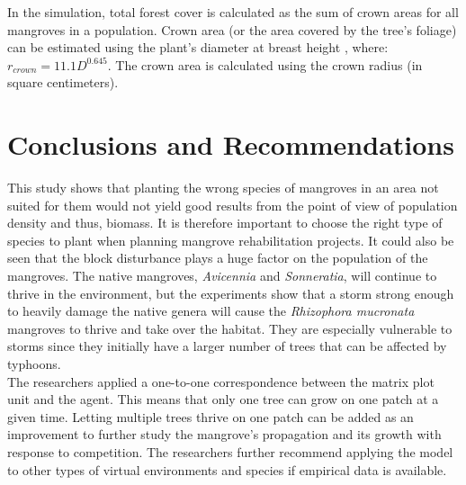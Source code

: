 In the simulation, total forest cover is calculated as the sum of crown areas for all mangroves in 
a population. Crown area (or the area covered by the tree's foliage) can be estimated using the
plant's diameter at breast height \cite{Hiebeler2000}, where: $r_{crown} = 11.1D^{0.645}$. The crown area is calculated using the crown radius (in square centimeters).

\section{Conclusions and
Recommendations}\label{conclusions-and-recommendations}

This study shows that planting the wrong species of mangroves in an area not
suited for them would not yield good results from the point of view of
population density and thus, biomass. It is therefore important to
choose the right type of species to plant when planning mangrove
rehabilitation projects. It could also be seen that the block
disturbance plays a huge factor on the population of the mangroves. The
native mangroves, \emph{Avicennia} and \emph{Sonneratia}, will continue
to thrive in the environment, but the experiments show that a storm
strong enough to heavily damage the native genera will cause the
\emph{Rhizophora mucronata} mangroves to thrive and take over the
habitat. They are especially vulnerable to storms since they initially
have a larger number of trees that can be affected by typhoons.\\
The researchers applied a one-to-one correspondence between the matrix
plot unit and the agent. This means that only one tree can grow on one
patch at a given time. Letting multiple trees thrive on one patch can be
added as an improvement to further study the mangrove's propagation and
its growth with response to competition. The researchers further
recommend applying the model to other types of virtual environments and
species if empirical data is available.
